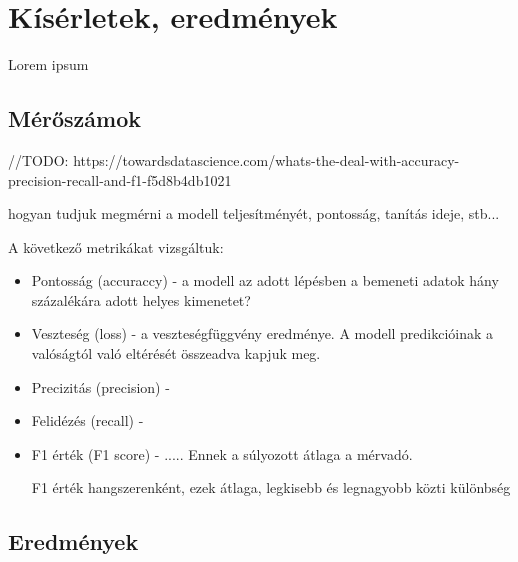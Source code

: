 \chapter{Kísérletek, eredmények} 
\label{ch:results}

Lorem ipsum

\section{Mérőszámok}

//TODO: https://towardsdatascience.com/whats-the-deal-with-accuracy-precision-recall-and-f1-f5d8b4db1021 \cite{fscore}

hogyan tudjuk megmérni a modell teljesítményét, pontosság, tanítás ideje, stb...

A következő metrikákat vizsgáltuk:

\begin{itemize}
\item Pontosság (accuraccy) - a modell az adott lépésben a bemeneti adatok hány százalékára adott helyes kimenetet?
\item Veszteség (loss) - a veszteségfüggvény eredménye. A modell predikcióinak a valóságtól való eltérését összeadva kapjuk meg.
\item Precizitás (precision) - 
\item Felidézés (recall) - 
\item F1 érték (F1 score) - ..... Ennek a súlyozott átlaga a mérvadó.


F1 érték hangszerenként, ezek átlaga, legkisebb és legnagyobb közti különbség
\end{itemize}

\section{Eredmények}


